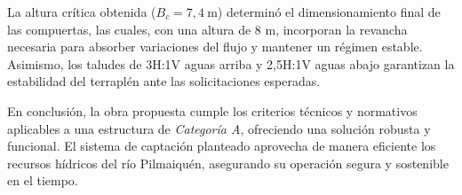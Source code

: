 \documentclass{article} %
\begin{document}
La altura crítica obtenida (\(B_c = 7{,}4\ \text{m}\)) determinó el dimensionamiento final de las compuertas, las cuales, con una altura de 8 m, incorporan la revancha necesaria para absorber variaciones del flujo y mantener un régimen estable. Asimismo, los taludes de 3H:1V aguas arriba y 2,5H:1V aguas abajo garantizan la estabilidad del terraplén ante las solicitaciones esperadas.

En conclusión, la obra propuesta cumple los criterios técnicos y normativos aplicables a una estructura de \textit{Categoría A}, ofreciendo una solución robusta y funcional. El sistema de captación planteado aprovecha de manera eficiente los recursos hídricos del río Pilmaiquén, asegurando su operación segura y sostenible en el tiempo.
\end{document}
